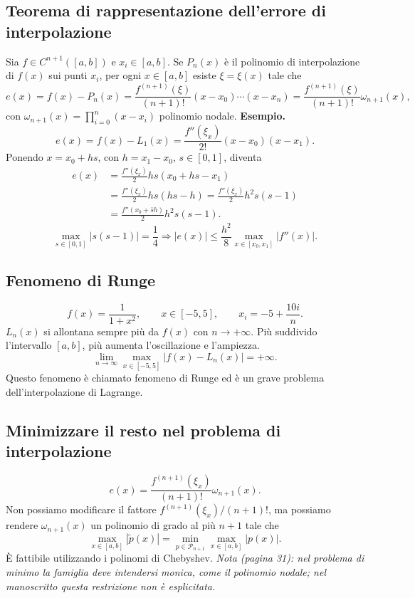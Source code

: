 \documentclass[11pt,a4paper]{article}
\newcommand{\pagina}[1]{\clearpage}
\begin{document}
\subsection*{Teorema di rappresentazione dell'errore di interpolazione}
Sia $f\in C^{n+1}([a,b])$ e $x_i\in[a,b]$. Se $P_n(x)$ è il polinomio di interpolazione di $f(x)$ sui punti $x_i$, per ogni $x\in[a,b]$ esiste $\xi=\xi(x)$ tale che
\[e(x)=f(x)-P_n(x)=\frac{f^{(n+1)}(\xi)}{(n+1)!}(x-x_0)\cdots(x-x_n)=\frac{f^{(n+1)}(\xi)}{(n+1)!}\omega_{n+1}(x),\]
con $\omega_{n+1}(x)=\prod_{i=0}^n(x-x_i)$ polinomio nodale.
\textbf{Esempio.}
\[e(x)=f(x)-L_1(x)=\frac{f''(\xi_x)}{2!}(x-x_0)(x-x_1).\]
Ponendo $x=x_0+hs$, con $h=x_1-x_0$, $s\in[0,1]$, diventa
\begin{align*}e(x)&=\frac{f''(\xi_x)}2hs(x_0+hs-x_1)\\&=\frac{f''(\xi_x)}2hs(hs-h)=\frac{f''(\xi_x)}2h^2s(s-1)\\&=\frac{f''(x_0+\bar s h)}2h^2s(s-1).\end{align*}
\[\max_{s\in[0,1]}|s(s-1)|=\frac14\Longrightarrow |e(x)|\le\frac{h^2}8\max_{x\in[x_0,x_1]}|f''(x)|.\]
\pagina{31}\subsection*{Fenomeno di Runge}
\[f(x)=\frac1{1+x^2},\qquad x\in[-5,5],\qquad x_i=-5+\frac{10i}{n}.\]
$L_n(x)$ si allontana sempre più da $f(x)$ con $n\to+\infty$. Più suddivido l'intervallo $[a,b]$, più aumenta l'oscillazione e l'ampiezza.
\[\lim_{n\to\infty}\max_{x\in[-5,5]}|f(x)-L_n(x)|=+\infty.\]
Questo fenomeno è chiamato fenomeno di Runge ed è un grave problema dell'interpolazione di Lagrange.
\begin{center}\end{center}
\subsection*{Minimizzare il resto nel problema di interpolazione}
\[e(x)=\frac{f^{(n+1)}(\xi_x)}{(n+1)!}\omega_{n+1}(x).\]
Non possiamo modificare il fattore $f^{(n+1)}(\xi_x)/(n+1)!$, ma possiamo rendere $\omega_{n+1}(x)$ un polinomio di grado al più $n+1$ tale che
\[\max_{x\in[a,b]}|\widetilde p(x)|=\min_{p\in\mathcal P_{n+1}}\max_{x\in[a,b]}|p(x)|.\]
È fattibile utilizzando i polinomi di Chebyshev.
\textit{Nota (pagina 31): nel problema di minimo la famiglia deve intendersi monica, come il polinomio nodale; nel manoscritto questa restrizione non è esplicitata.}
\end{document}
